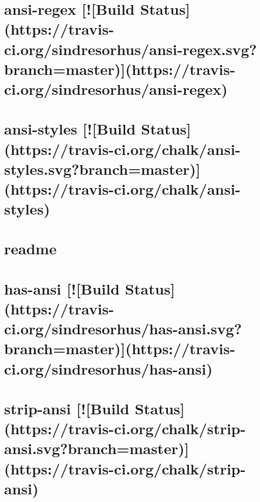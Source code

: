 \documentclass[twoside]{book}
\newcommand{\+}{\discretionary{\mbox{\scriptsize$\hookleftarrow$}}{}{}}
\begin{document}
\chapter{ansi-\/regex \mbox{[}!\mbox{[}Build Status\mbox{]}(https\+://travis-\/ci.org/sindresorhus/ansi-\/regex.svg?branch=master)\mbox{]}(https\+://travis-\/ci.org/sindresorhus/ansi-\/regex)}
\label{md_app_web_node_modules_grunt-contrib-cssmin_node_modules_ansi-regex_readme}

\chapter{ansi-\/styles \mbox{[}!\mbox{[}Build Status\mbox{]}(https\+://travis-\/ci.org/chalk/ansi-\/styles.svg?branch=master)\mbox{]}(https\+://travis-\/ci.org/chalk/ansi-\/styles)}
\label{md_app_web_node_modules_grunt-contrib-cssmin_node_modules_ansi-styles_readme}

\chapter{readme}
\label{md_app_web_node_modules_grunt-contrib-cssmin_node_modules_chalk_readme}

\chapter{has-\/ansi \mbox{[}!\mbox{[}Build Status\mbox{]}(https\+://travis-\/ci.org/sindresorhus/has-\/ansi.svg?branch=master)\mbox{]}(https\+://travis-\/ci.org/sindresorhus/has-\/ansi)}
\label{md_app_web_node_modules_grunt-contrib-cssmin_node_modules_has-ansi_readme}

\chapter{strip-\/ansi \mbox{[}!\mbox{[}Build Status\mbox{]}(https\+://travis-\/ci.org/chalk/strip-\/ansi.svg?branch=master)\mbox{]}(https\+://travis-\/ci.org/chalk/strip-\/ansi)}
\label{md_app_web_node_modules_grunt-contrib-cssmin_node_modules_strip-ansi_readme}

\end{document}
